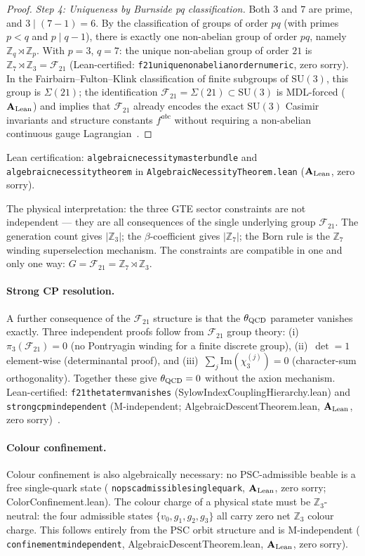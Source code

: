 \documentclass[11pt]{article}
\theoremstyle{remark}
\newcommand{\ZS}{\mathbb{Z}_7}
\newcommand{\ZZ}{\mathbb{Z}}
\newcommand{\lean}[1]{%
  \penalty-100
  \begingroup\def\_{\textunderscore\allowbreak}\texttt{#1}\endgroup}
\newcommand{\FTT}{\mathcal{F}_{21}}
\newcommand{\CatAL}{\ensuremath{\textbf{A}_{\rm Lean}}}
\begin{document}
\begin{proof}
\textit{Step 4: Uniqueness by Burnside pq classification.}
Both $3$ and $7$ are prime, and $3 \mid (7-1) = 6$.
By the classification of groups of order $pq$ (with primes $p < q$ and $p \mid q-1$),
there is exactly one non-abelian group of order $pq$, namely $\ZZ_q \rtimes \ZZ_p$.
With $p = 3$, $q = 7$: the unique non-abelian group of order $21$ is
$\ZS \rtimes \ZZ_3 = \FTT$
(Lean-certified: \lean{f21\_unique\_nonabelian\_order\_21\_numeric}, zero sorry).
In the Fairbairn--Fulton--Klink classification of finite subgroups of $\mathrm{SU}(3)$,
this group is $\Sigma(21)$; the identification $\FTT = \Sigma(21) \subset \mathrm{SU}(3)$
is MDL-forced ($\CatAL$) and implies that $\FTT$ already encodes
the exact $\mathrm{SU}(3)$ Casimir invariants and structure constants $f^{abc}$ without
requiring a non-abelian continuous gauge Lagrangian~\cite{SpivackGTEUnification}.
\end{proof}

\noindent
Lean certification: \lean{algebraic\_necessity\_master\_bundle} and
\lean{algebraic\_necessity\_theorem} in \lean{AlgebraicNecessityTheorem.lean}
($\CatAL$, zero sorry).

The physical interpretation: the three GTE sector constraints are not
independent --- they are all consequences of the single underlying group $\FTT$.
The generation count gives $|\ZZ_3|$; the $\beta$-coefficient gives $|\ZS|$;
the Born rule is the $\ZS$ winding superselection mechanism.  The constraints
are compatible in one and only one way: $G = \FTT = \ZS \rtimes \ZZ_3$.

\paragraph{Strong CP resolution.}
A further consequence of the $\FTT$ structure is that the $\theta_{\rm QCD}$
parameter vanishes exactly.  Three independent proofs follow from $\FTT$ group
theory: (i)~$\pi_3(\FTT) = 0$ (no Pontryagin winding for a finite discrete group),
(ii)~$\det = 1$ element-wise (determinantal proof), and
(iii)~$\sum_j \mathrm{Im}(\chi_3^{(j)}) = 0$ (character-sum orthogonality).
Together these give $\theta_{\rm QCD} = 0$ without the axion mechanism.
Lean-certified: \lean{f21\_theta\_term\_vanishes} (SylowIndexCouplingHierarchy.lean)
and \lean{strong\_cp\_m\_independent} (M-independent; AlgebraicDescentTheorem.lean,
$\CatAL$, zero sorry)~\cite{SpivackGTEQCDStructure}.

\paragraph{Colour confinement.}
Colour confinement is also algebraically necessary: no PSC-admissible beable is a
free single-quark state (\lean{no\_psc\_admissible\_single\_quark}, $\CatAL$, zero
sorry; ColorConfinement.lean).  The colour charge of a physical state
must be $\mathbb{Z}_3$-neutral: the four admissible states $\{v_0, g_1, g_2, g_3\}$
all carry zero net $\mathbb{Z}_3$ colour charge.  This follows entirely from the PSC
orbit structure and is M-independent (\lean{confinement\_m\_independent},
AlgebraicDescentTheorem.lean, $\CatAL$, zero sorry).
\end{document}
